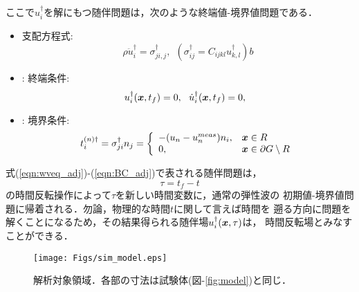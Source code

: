 ここで$u_i^{\dagger}$を解にもつ随伴問題は，次のような終端値-境界値問題である．
\begin{itemize}
\item
支配方程式:
\begin{equation}
	\rho \ddot{u}_i^{\dagger} =
	\sigma^{\dagger}_{ji,j}, \ \ 
	\left(
	\sigma_{ij}^{\dagger}= C_{ijkl}u_{k,l}^{\dagger}\right)
	b\label{eqn:wveq_adj}
\end{equation}
\item: 
終端条件:
\begin{equation}
	u_i^{\dagger}(\boldsymbol{x},t_f) =0,  \ \
	\dot{u}_i^{\dagger}(\boldsymbol{x},t_f) =0,  \ \
	\label{eqn:IC_adj}
\end{equation}
\item:
境界条件:
\begin{equation}
	t_i^{(n)\dagger}
	=
	\sigma_{ji}^{\dagger}n_j =
	\left\{
		\begin{array}{ll}
			-(u_n-u_n^{meas})n_i, & \boldsymbol{x}\in R \\
			0, & \boldsymbol{x} \in \partial G\setminus R
		\end{array}
	\right.
	\label{eqn:BC_adj}
\end{equation}
\end{itemize}
式(\ref{eqn:wveq_adj})-(\ref{eqn:BC_adj})で表される随伴問題は，
\begin{equation}
	\tau=t_f-t
	\label{eqn:tau_def}
\end{equation}
の時間反転操作によって$\tau$を新しい時間変数に，通常の弾性波の
初期値-境界値問題に帰着される．勿論，物理的な時間$t$に関して言えば時間を
遡る方向に問題を解くことになるため，その結果得られる随伴場$u_i^{\dagger}(\boldsymbol{x},\tau)$は，
時間反転場とみなすことができる．
\begin{figure}[htb]
\centering
	\texttt{[image: Figs/sim\_model.eps]}
	\caption{解析対象領域．各部の寸法は試験体({\rm 図}-\ref{fig:model})と同じ．}
	\label{fig:fd_model}
\end{figure}
